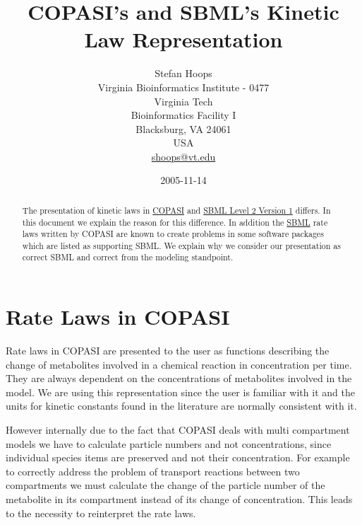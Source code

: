 \documentclass[12pt,english]{article}
\begin{document}
\title{COPASI's and SBML's Kinetic Law Representation}

\author{Stefan Hoops\\
 Virginia Bioinformatics Institute - 0477\\
 Virginia Tech\\
 Bioinformatics Facility I\\
 Blacksburg, VA 24061 \\
 USA \\
 \href{mailto:Stefan Hoops <shoops@vt.edu>}{shoops@vt.edu}}

\date{2005-11-14}

\maketitle
\begin{abstract}
The presentation of kinetic laws in
\href{http://www.copasi.org}{COPASI} and
\href{http://prdownloads.sourceforge.net/sbml/sbml-level-2-v1.pdf?download}
{SBML Level 2 Version 1} differs. In this document we explain the
reason for this difference. In addition the
\href{http://www.sbml.org}{SBML} rate laws written by COPASI are known
to create problems in some software packages which are listed as
supporting SBML. We explain why we consider our presentation as
correct SBML and correct from the modeling standpoint.
\end{abstract}

\section{Rate Laws in COPASI}
Rate laws in COPASI are presented to the user as functions describing
the change of metabolites involved in a chemical reaction in
concentration per time. They are always dependent on the
concentrations of metabolites involved in the model. We are using this
representation since the user is familiar with it and the units for
kinetic constants found in the literature are normally consistent with
it.

However internally due to the fact that COPASI deals with multi
compartment models we have to calculate particle numbers and not
concentrations, since individual species items are preserved and not
their concentration. For example to correctly address the problem of
transport reactions between two compartments we must calculate the
change of the particle number of the metabolite in its compartment
instead of its change of concentration. This leads to the necessity to
reinterpret the rate laws.
\end{document}
